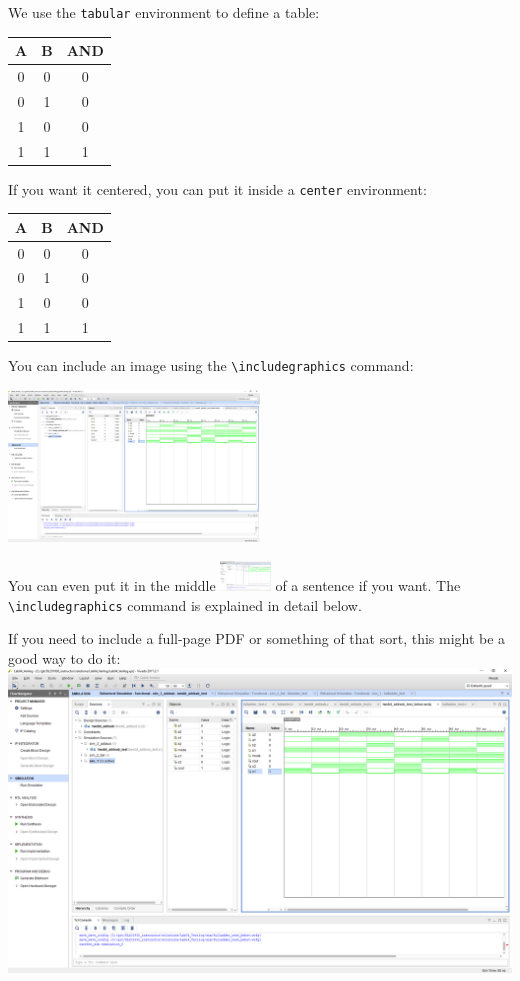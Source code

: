 \documentclass[11pt]{article}
\begin{document}
We use the \texttt{tabular} environment to define a table:

\begin{tabular}{cc|c}
	\toprule
	A & B & AND \\
	\midrule
	0 & 0 & 0 \\
	0 & 1 & 0 \\
	1 & 0 & 0 \\
	1 & 1 & 1 \\
	\bottomrule
\end{tabular} 

If you want it centered, you can put it inside a \texttt{center} environment:

\begin{center}
	\begin{tabular}{cc|c}
		\toprule
		A & B & AND \\
		\midrule
		0 & 0 & 0 \\
		0 & 1 & 0 \\
		1 & 0 & 0 \\
		1 & 1 & 1 \\
		\bottomrule
	\end{tabular} 
\end{center}

You can include an image using the \verb|\includegraphics| command:

\begin{center}
	\includegraphics[width=0.5\textwidth]{Lab1Table}
\end{center}

You can even put it in the middle \includegraphics[width=0.1\textwidth]{Lab1Table}
of a sentence if you want. The \verb|\includegraphics| command is explained in detail below.

If you need to include a full-page PDF or something of that sort, this might be a good way to do it:
\includegraphics[width=\textwidth]{Lab1Table}
\end{document}
